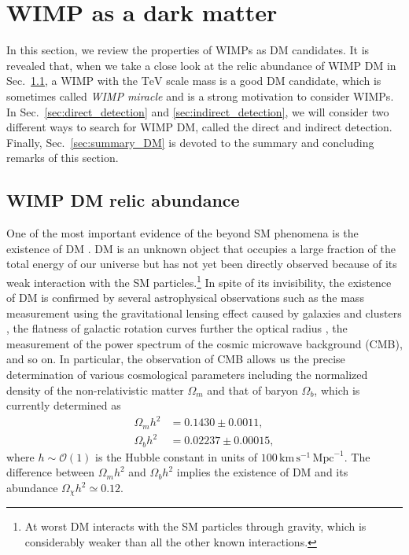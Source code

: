 \documentclass[12pt,twoside,book]{article}
\begin{document}
\section{WIMP as a dark matter}
\setcounter{equation}{0}
\label{sec:DM}

\vskip 0.1in

In this section, we review the properties of WIMPs as DM candidates.
It is revealed that, when we take a close look at the relic abundance of WIMP DM in Sec.~\ref{sec:relic}, a WIMP with the $\mathrm{TeV}$ scale mass is a good DM candidate, which is sometimes called \textit{WIMP miracle} and is a strong motivation to consider WIMPs.
In Sec.~\ref{sec:direct_detection} and \ref{sec:indirect_detection}, we will consider two different ways to search for WIMP DM, called the direct and indirect detection.
Finally, Sec.~\ref{sec:summary_DM} is devoted to the summary and concluding remarks of this section.


\subsection{WIMP DM relic abundance}
\label{sec:relic}

One of the most important evidence of the beyond SM phenomena is the existence of DM \cite{Zwicky:1933}.
DM is an unknown object that occupies a large fraction of the total energy of our universe but has not yet been directly observed because of its weak interaction with the SM particles.\footnote{
  At worst DM interacts with the SM particles through gravity, which is considerably weaker than all the other known interactions.
}
In spite of its invisibility, the existence of DM is confirmed by several astrophysical observations such as the mass measurement using the gravitational lensing effect caused by galaxies and clusters \cite{Zwicky:1937, Trimble:1987ee}, the flatness of galactic rotation curves further the optical radius \cite{1939LicOB..19...41B, Begeman:1991iy}, the measurement of the power spectrum of the cosmic microwave background (CMB), and so on.
In particular, the observation of CMB allows us the precise determination of various cosmological parameters \cite{Jungman:1995av, Jungman:1995bz} including the normalized density of the non-relativistic matter $\Omega_m$ and that of baryon $\Omega_b$, which is currently determined as \cite{Aghanim:2018eyx}
\begin{align}
  \Omega_m h^2 &= 0.1430 \pm 0.0011,\\
  \Omega_b h^2 &= 0.02237 \pm 0.00015,
\end{align}
where $h \sim \mathcal{O}(1)$ is the Hubble constant in units of $100\, \mathrm{km}\, \mathrm{s}^{-1}\, \mathrm{Mpc}^{-1}$.
The difference between $\Omega_m h^2$ and $\Omega_b h^2$ implies the existence of DM and its abundance $\Omega_\chi h^2 \simeq 0.12$.
\end{document}
